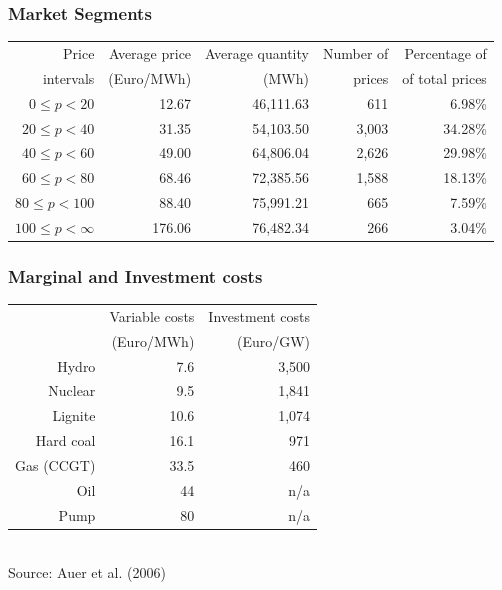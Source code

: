 \begin{frame}
  \frametitle{Market Segments}

\begin{center}
\small
\begin{tabular}{rrrrr}
  \hline
Price & Average price  & Average quantity & Number of & Percentage of \\
intervals& (Euro/MWh) &  (MWh) &  prices & of total prices\\
  \hline\hline
$0\leq p<20$ & 12.67 & 46,111.63 & 611 & 6.98\% \\
$20\leq p<40$ & 31.35 & 54,103.50 & 3,003 & 34.28\% \\
$40\leq p<60$ & 49.00 & 64,806.04 & 2,626 & 29.98\% \\
$60\leq p<80$ & 68.46 & 72,385.56 & 1,588 & 18.13\% \\
$80\leq p<100$ & 88.40 & 75,991.21 & 665 & 7.59\% \\
$100\leq p<\infty$& 176.06 & 76,482.34 & 266 & 3.04\% \\
   \hline
\end{tabular}  
\normalsize
\end{center}

\end{frame}


\begin{frame}
  \frametitle{Marginal and Investment costs}
\begin{center}
  \begin{tabular}{rrr}
\hline
           & Variable costs & Investment costs\\
           &  (Euro/MWh)    &  (Euro/GW) \\
\hline\hline
     Hydro &        7.6 &    3,500\\

   Nuclear &        9.5 &    1,841 \\

   Lignite &       10.6 &    1,074 \\

 Hard coal &       16.1 &     971 \\

 Gas (CCGT) &       33.5 &     460 \\

Oil & 44            &   n/a\\

Pump &         80 &       n/a\\
\hline
\end{tabular}
\\
\vspace{0.3cm}
\scriptsize Source: Auer et al. (2006)
\end{center}
\end{frame}

